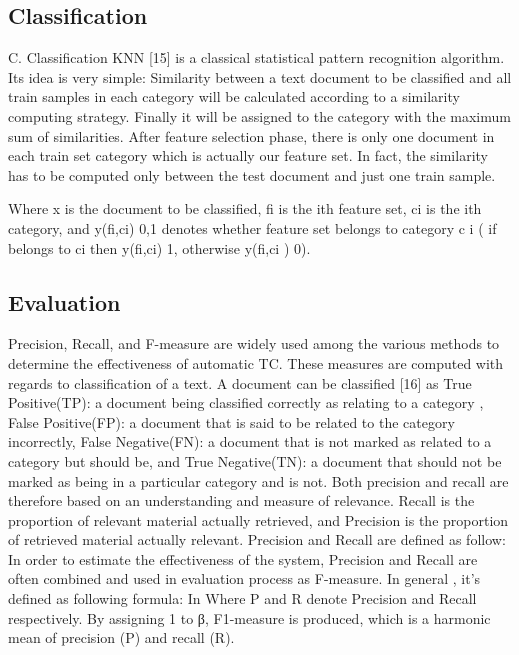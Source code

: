 \documentclass{sigchi}
\begin{document}
\subsection{Classification}\label{sectionClassification}
C. Classification
KNN [15] is a classical statistical pattern recognition
algorithm. Its idea is very simple: Similarity between a text
document to be classified and all train samples in each
category will be calculated according to a similarity
computing strategy. Finally it will be assigned to the category
with the maximum sum of similarities.
After feature selection phase, there is only one document
in each train set category which is actually our feature set. In
fact, the similarity has to be computed only between the test
document and just one train sample.

Where x is the document to be classified, fi is the ith
feature set, ci is the ith category, and y(fi,ci) {0,1} denotes
whether feature set belongs to category c i ( if belongs to ci
then y(fi,ci) 1, otherwise y(fi,ci ) 0).

\subsection{Evaluation}
Precision, Recall, and F-measure are widely used among
the various methods to determine the effectiveness of
automatic TC. These measures are computed with regards to
classification of a text. A document can be classified [16] as
True Positive(TP): a document being classified correctly as
relating to a category , False Positive(FP): a document that is
said to be related to the category incorrectly, False
Negative(FN): a document that is not marked as related to a
category but should be, and True Negative(TN): a document
that should not be marked as being in a particular category and
is not.
Both precision and recall are therefore based on an
understanding and measure of relevance. Recall is the
proportion of relevant material actually retrieved, and
Precision is the proportion of retrieved material actually
relevant. Precision and Recall are defined as follow:
In order to estimate the effectiveness of the system,
Precision and Recall are often combined and used in
evaluation process as F-measure. In general , it’s defined as
following formula:
In Where P and R denote Precision and Recall
respectively. By assigning 1 to β, F1-measure is produced,
which is a harmonic mean of precision (P) and recall (R).
\end{document}
